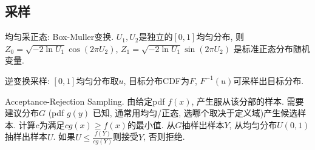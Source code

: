 \documentclass[UTF8]{ctexart}
\begin{document}
\subsection{采样}

均匀采正态: Box-Muller变换. $U_1, U_2$是独立的$[0, 1]$均匀分布,
则$Z_0=\sqrt{-2\ln U_1}\cos(2\pi U_2)$, $Z_1=\sqrt{-2\ln U_1}\sin(2\pi U_2)$
是标准正态分布随机变量.

逆变换采样: $[0,1]$均匀分布取$u$, 目标分布CDF为$F$, $F^{-1}(u)$可采样出目标分布.

Acceptance-Rejection Sampling.
由给定pdf $f(x)$, 产生服从该分部的样本.
需要建议分布$G$ (pdf $g(y)$ 已知, 通常用均匀/正态, 选哪个取决于定义域)产生候选样本.
计算$c$为满足$cg(x)\geq f(x)$的最小值.
从$G$抽样出样本$Y$, 从均匀分布$U(0,1)$抽样出样本$U$.
如果$U\leq\frac{f(Y)}{cg(Y)}$则接受$Y$, 否则拒绝.
\end{document}
